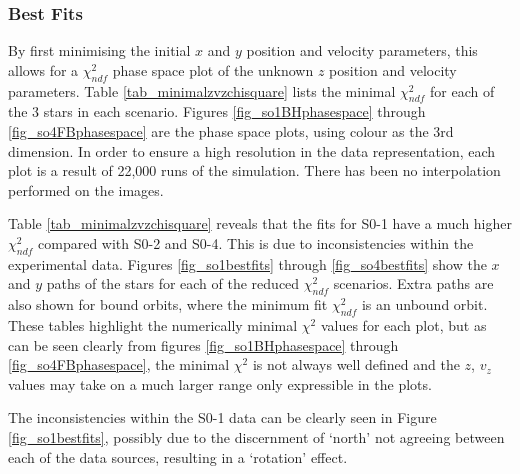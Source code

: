 \subsubsection{Best Fits}
\label{bestfits}
By first minimising the initial $x$ and $y$ position and velocity parameters, this allows for a $\chi^2_{ndf}$ phase space plot of the
unknown $z$ position and velocity parameters. Table \ref{tab_minimalzvzchisquare} lists the minimal $\chi^2_{ndf}$ for each
of the 3 stars in each scenario. Figures \ref{fig_so1BHphasespace} through \ref{fig_so4FBphasespace} are the phase space plots, using
colour as the 3rd dimension. In order to ensure a high resolution in the data representation, each plot is a result of 22,000 runs of
the simulation. There has been no interpolation performed on the images.

Table \ref{tab_minimalzvzchisquare} reveals that the fits for S0-1 have a much higher $\chi^2_{ndf}$ compared with S0-2 and S0-4.
This is due to inconsistencies within the experimental data. Figures \ref{fig_so1bestfits} through \ref{fig_so4bestfits} show the
$x$ and $y$ paths of the stars for each of the reduced $\chi^2_{ndf}$ scenarios. Extra paths are also shown for bound orbits,
where the minimum fit $\chi^2_{ndf}$ is an unbound orbit. These tables highlight the numerically minimal $\chi^2$ values for each plot,
but as can be seen clearly from figures \ref{fig_so1BHphasespace} through \ref{fig_so4FBphasespace}, the minimal $\chi^2$ is not always
well defined and the $z$, $v_z$ values may take on a much larger range only expressible in the plots.

The inconsistencies within the S0-1 data can be clearly seen in Figure
\ref{fig_so1bestfits}, possibly due to the discernment of `north' not agreeing between each of the data sources, resulting in a
`rotation' effect.

